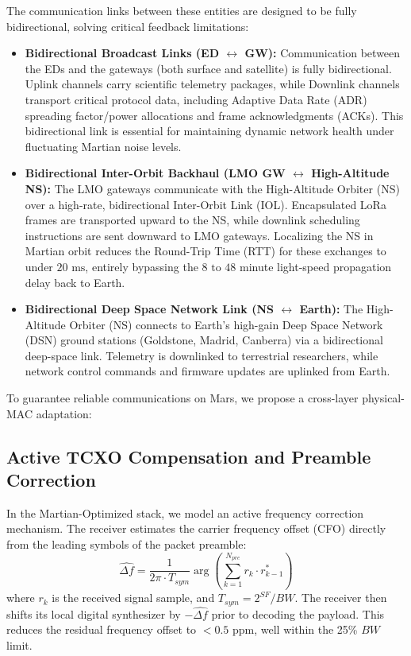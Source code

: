 \documentclass[journal,10pt,doublecolumn]{IEEEtran}
\begin{document}
The communication links between these entities are designed to be fully bidirectional, solving critical feedback limitations:
\begin{itemize}
    \item \textbf{Bidirectional Broadcast Links (ED $\leftrightarrow$ GW):} Communication between the EDs and the gateways (both surface and satellite) is fully bidirectional. Uplink channels carry scientific telemetry packages, while Downlink channels transport critical protocol data, including Adaptive Data Rate (ADR) spreading factor/power allocations and frame acknowledgments (ACKs). This bidirectional link is essential for maintaining dynamic network health under fluctuating Martian noise levels.
    \item \textbf{Bidirectional Inter-Orbit Backhaul (LMO GW $\leftrightarrow$ High-Altitude NS):} The LMO gateways communicate with the High-Altitude Orbiter (NS) over a high-rate, bidirectional Inter-Orbit Link (IOL). Encapsulated LoRa frames are transported upward to the NS, while downlink scheduling instructions are sent downward to LMO gateways. Localizing the NS in Martian orbit reduces the Round-Trip Time (RTT) for these exchanges to under $20\text{ ms}$, entirely bypassing the $8\text{ to }48$ minute light-speed propagation delay back to Earth.
    \item \textbf{Bidirectional Deep Space Network Link (NS $\leftrightarrow$ Earth):} The High-Altitude Orbiter (NS) connects to Earth's high-gain Deep Space Network (DSN) ground stations (Goldstone, Madrid, Canberra) via a bidirectional deep-space link. Telemetry is downlinked to terrestrial researchers, while network control commands and firmware updates are uplinked from Earth.
\end{itemize}

To guarantee reliable communications on Mars, we propose a cross-layer physical-MAC adaptation:

\subsection{Active TCXO Compensation and Preamble Correction}
In the Martian-Optimized stack, we model an active frequency correction mechanism. The receiver estimates the carrier frequency offset (CFO) directly from the leading symbols of the packet preamble:
\begin{equation}
    \widehat{\Delta f} = \frac{1}{2\pi \cdot T_{sym}} \arg\left( \sum_{k=1}^{N_{pre}} r_k \cdot r_{k-1}^* \right)
\end{equation}
where $r_k$ is the received signal sample, and $T_{sym} = 2^{SF}/BW$. The receiver then shifts its local digital synthesizer by $-\widehat{\Delta f}$ prior to decoding the payload. This reduces the residual frequency offset to $< 0.5$ ppm, well within the 25\% $BW$ limit.
\end{document}
